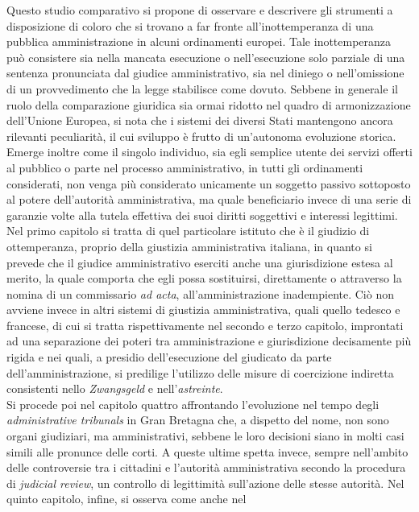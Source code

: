\documentclass[12pt,it,a4paper,]{report}
\begin{document}
Questo studio comparativo si propone di osservare e descrivere gli
strumenti a disposizione di coloro che si trovano a far fronte
all'inottemperanza di una pubblica amministrazione in alcuni ordinamenti
europei. Tale inottemperanza può consistere sia nella mancata esecuzione
o nell'esecuzione solo parziale di una sentenza pronunciata dal giudice
amministrativo, sia nel diniego o nell'omissione di un provvedimento che
la legge stabilisce come dovuto. Sebbene in generale il ruolo della
comparazione giuridica sia ormai ridotto nel quadro di armonizzazione
dell'Unione Europea, si nota che i sistemi dei diversi Stati mantengono
ancora rilevanti peculiarità, il cui sviluppo è frutto di un'autonoma
evoluzione storica. Emerge inoltre come il singolo individuo, sia egli
semplice utente dei servizi offerti al pubblico o parte nel processo
amministrativo, in tutti gli ordinamenti considerati, non venga più
considerato unicamente un soggetto passivo sottoposto al potere
dell'autorità amministrativa, ma quale beneficiario invece di una serie
di garanzie volte alla tutela effettiva dei suoi diritti soggettivi e
interessi legittimi. Nel primo capitolo si tratta di quel particolare
istituto che è il giudizio di ottemperanza, proprio della giustizia
amministrativa italiana, in quanto si prevede che il giudice
amministrativo eserciti anche una giurisdizione estesa al merito, la
quale comporta che egli possa sostituirsi, direttamente o attraverso la
nomina di un commissario \emph{ad acta}, all'amministrazione
inadempiente. Ciò non avviene invece in altri sistemi di giustizia
amministrativa, quali quello tedesco e francese, di cui si tratta
rispettivamente nel secondo e terzo capitolo, improntati ad una
separazione dei poteri tra amministrazione e giurisdizione decisamente
più rigida e nei quali, a presidio dell'esecuzione del giudicato da
parte dell'amministrazione, si predilige l'utilizzo delle misure di
coercizione indiretta consistenti nello \emph{Zwangsgeld} e
nell'\emph{astreinte}.\\
Si procede poi nel capitolo quattro affrontando l'evoluzione nel tempo
degli \emph{administrative tribunals} in Gran Bretagna che, a dispetto
del nome, non sono organi giudiziari, ma amministrativi, sebbene le loro
decisioni siano in molti casi simili alle pronunce delle corti. A queste
ultime spetta invece, sempre nell'ambito delle controversie tra i
cittadini e l'autorità amministrativa secondo la procedura di
\emph{judicial review}, un controllo di legittimità sull'azione delle
stesse autorità. Nel quinto capitolo, infine, si osserva come anche nel
\end{document}

